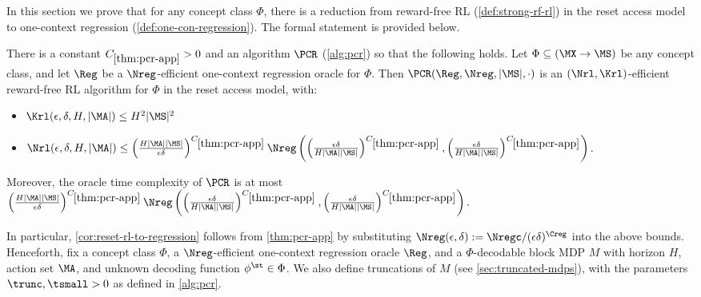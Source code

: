 

In this section we prove that for any concept class $\Phi$, there is a reduction from reward-free RL (\cref{def:strong-rf-rl}) in the reset access model to one-context regression (\cref{def:one-con-regression}). The formal statement is provided below.


\begin{theorem}\label{thm:pcr-app}
There is a constant $C_{\ref{thm:pcr-app}}>0$ and an algorithm $\PCR$ (\cref{alg:pcr}) so that the following holds. Let $\Phi \subseteq (\MX\to\MS)$ be any concept class, and let $\Reg$ be a $\Nreg$-efficient one-context regression oracle for $\Phi$. Then $\PCR(\Reg,\Nreg,|\MS|,\cdot)$ %
is an $(\Nrl,\Krl)$-efficient reward-free RL algorithm for $\Phi$ in the reset access model, with:
\begin{itemize}
    \item $\Krl(\epsilon,\delta,H,|\MA|) \leq H^2|\MS|^2$
    \item $\Nrl(\epsilon,\delta,H,|\MA|) \leq \left(\frac{H|\MA||\MS|}{\epsilon\delta}\right)^{C_{\ref{thm:pcr-app}}} \Nreg\left(\left(\frac{\epsilon\delta}{H|\MA||\MS|}\right)^{C_{\ref{thm:pcr-app}}},\left(\frac{\epsilon\delta}{H|\MA||\MS|}\right)^{C_{\ref{thm:pcr-app}}}\right)$.
\end{itemize}
Moreover, the oracle time complexity of $\PCR$ is at most $\left(\frac{H|\MA||\MS|}{\epsilon\delta}\right)^{C_{\ref{thm:pcr-app}}} \Nreg\left(\left(\frac{\epsilon\delta}{H|\MA||\MS|}\right)^{C_{\ref{thm:pcr-app}}},\left(\frac{\epsilon\delta}{H|\MA||\MS|}\right)^{C_{\ref{thm:pcr-app}}}\right).$
\end{theorem}



In particular, \cref{cor:reset-rl-to-regression} follows from \cref{thm:pcr-app} by substituting $\Nreg(\epsilon,\delta) := \Nregc/(\epsilon\delta)^{\Creg}$ into the above bounds. Henceforth, fix a concept class $\Phi$, a $\Nreg$-efficient one-context regression oracle $\Reg$, and a $\Phi$-decodable block MDP $M$ with horizon $H$, action set $\MA$, and unknown decoding function $\phi^\st \in \Phi$. We also define truncations of $M$ (see \cref{sec:truncated-mdps}), with the parameters $\trunc,\tsmall>0$ as defined in \cref{alg:pcr}.

